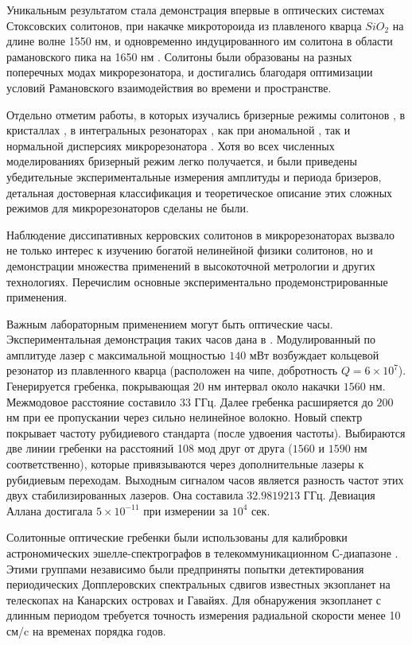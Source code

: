 Уникальным результатом стала демонстрация впервые в оптических системах Стоксовских солитонов, при накачке микротороида из плавленого кварца $SiO_2$ на длине волне 1550 нм, и одновременно индуцированного им солитона в области рамановского пика на 1650 нм \cite{Yang2016stokes}. Солитоны были образованы на разных поперечных модах микрорезонатора, и достигались благодаря оптимизации условий Рамановского взаимодействия во времени и пространстве.

Отдельно отметим работы, в которых изучались бризерные режимы солитонов \cite{Matsko2012}, в кристаллах \cite{Lucas2017breather}, в интегральных резонаторах \cite{PhysRevLett.117.163901,Yu2017breather}, как при аномальной \cite{Yu2017breather}, так и нормальной дисперсиях микрорезонатора \cite{PhysRevLett.121.257401}. Хотя во всех численных моделированиях бризерный режим легко получается, и были приведены убедительные экспериментальные измерения амплитуды и периода бризеров, детальная достоверная классификация и теоретическое описание этих сложных режимов для микрорезонаторов сделаны не были.

Наблюдение диссипативных керровских солитонов в микрорезонаторах вызвало не только интерес к изучению богатой нелинейной физики солитонов, но и демонстрации множества применений в высокоточной метрологии и других технологиях. Перечислим основные экспериментально продемонстрированные применения.

Важным лабораторным применением могут быть оптические часы. Экспериментальная демонстрация таких часов дана в \cite{Papp2014}. Модулированный по амплитуде лазер с максимальной мощностью $140$ мВт возбуждает кольцевой резонатор из плавленного кварца (расположен на чипе, добротность $Q=6\times10^7$). Генерируется гребенка, покрывающая $20$ нм интервал около накачки $1560$ нм. Межмодовое расстояние составило $33$ ГГц. Далее гребенка расширяется до $200$ нм при ее пропускании через сильно нелинейное волокно. Новый спектр покрывает частоту рубидиевого стандарта (после удвоения частоты). Выбираются две линии гребенки на расстояний 108 мод друг от друга ($1560$ и $1590$ нм соответственно), которые привязываются через дополнительные лазеры к рубидиевым переходам. Выходным сигналом часов является разность частот этих двух стабилизированных лазеров. Она составила $32.9819213$ ГГц. Девиация Аллана достигала $5\times10^{-11}$ при измерении за $10^4$ сек.

Солитонные оптические гребенки были использованы для калибровки астрономических эшелле-спектрографов в телекоммуникационном С-диапазоне \cite{}. Этими группами независимо были предприняты попытки детектирования периодических Допплеровских спектральных сдвигов известных экзопланет на телескопах на Канарских островах и Гавайях. Для обнаружения экзопланет с длинным периодом требуется точность измерения радиальной скорости менее 10 см/c на временах порядка годов.

